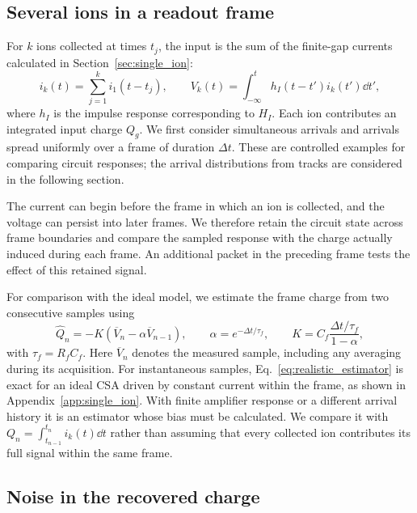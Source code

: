 \subsection{Several ions in a readout frame}

For $k$ ions collected at times $t_j$, the input is the sum of the finite-gap currents calculated in Section~\ref{sec:single_ion}:
\begin{equation}
 i_k(t)=\sum_{j=1}^{k}i_1(t-t_j),\qquad
 V_k(t)=\int_{-\infty}^{t}h_I(t-t')i_k(t')\dd t',
 \label{eq:realistic_packet}
\end{equation}
where $h_I$ is the impulse response corresponding to $H_I$. Each ion contributes an integrated input charge $Q_g$. We first consider simultaneous arrivals and arrivals spread uniformly over a frame of duration $\Delta t$. These are controlled examples for comparing circuit responses; the arrival distributions from tracks are considered in the following section.

The current can begin before the frame in which an ion is collected, and the voltage can persist into later frames. We therefore retain the circuit state across frame boundaries and compare the sampled response with the charge actually induced during each frame. An additional packet in the preceding frame tests the effect of this retained signal.

For comparison with the ideal model, we estimate the frame charge from two consecutive samples using
\begin{equation}
 \widehat Q_n=-K\left(\overline V_n-\alpha\overline V_{n-1}\right),\qquad
 \alpha=e^{-\Delta t/\tau_f},\qquad
 K=C_f\frac{\Delta t/\tau_f}{1-\alpha},
 \label{eq:realistic_estimator}
\end{equation}
with $\tau_f=R_fC_f$. Here $\overline V_n$ denotes the measured sample, including any averaging during its acquisition. For instantaneous samples, Eq.~\eqref{eq:realistic_estimator} is exact for an ideal CSA driven by constant current within the frame, as shown in Appendix~\ref{app:single_ion}. With finite amplifier response or a different arrival history it is an estimator whose bias must be calculated. We compare it with $Q_n=\int_{t_{n-1}}^{t_n}i_k(t)\dd t$ rather than assuming that every collected ion contributes its full signal within the same frame.

\subsection{Noise in the recovered charge}

